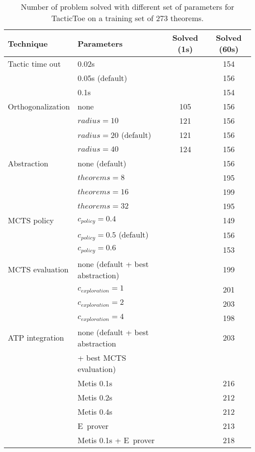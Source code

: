 \documentclass[runningheads,a4paper,draft]{svjour3}
\def\eprover{\textsf{E~prover}\xspace}
\def\metis{\textsf{Metis}\xspace}
\def\tactictoe{\textsf{TacticToe}\xspace}
\newcommand{\ra}[1]{\renewcommand{\arraystretch}{#1}}
\begin{document}
\begin{table}[ht]
\centering\ra{1.3}
\small
\begin{tabular}{llcc}
\toprule
 Technique & Parameters & Solved (1s) & Solved (60s)\\
\midrule
Tactic time out & 0.02s && 154\\
                & 0.05s (default) && 156\\
                & 0.1s && 154\\
\midrule
Orthogonalization & none & 105 & 156 \\
                  & $radius = 10$ & 121 & 156 \\
                  & $radius = 20$ (default) & 121 & 156 \\
                  & $radius = 40$ & 124 & 156 \\
\midrule
Abstraction       & none (default)  && 156\\
                  & $theorems = 8$  && 195\\
                  & $theorems = 16$ && 199\\
                  & $theorems = 32$ && 195\\
\midrule
  MCTS policy & $c_{\mathit{policy}} = 0.4$ && 149\\
            & $c_{\mathit{policy}} = 0.5$ (default) && 156\\
            & $c_{\mathit{policy}} = 0.6$ && 153\\
\midrule
MCTS evaluation & none (default + best abstraction) && 199\\
        & $c_{\mathit{exploration}} = 1$ && 201\\
        & $c_{\mathit{exploration}} = 2$ && 203\\
        & $c_{\mathit{exploration}} = 4$ && 198\\
\midrule
ATP integration & none (default + best abstraction && 203\\
                &  + best MCTS evaluation) &&\\
                & \metis 0.1s && 216\\
                & \metis 0.2s && 212\\
                & \metis 0.4s && 212\\
                & \eprover && 213\\
                & \metis 0.1s + \eprover && 218\\
\bottomrule
\end{tabular}
\caption{\label{tab:tuning} Number of problem solved with different set of
parameters for \tactictoe on a training set of 273 theorems.}
\end{table}
\end{document}
